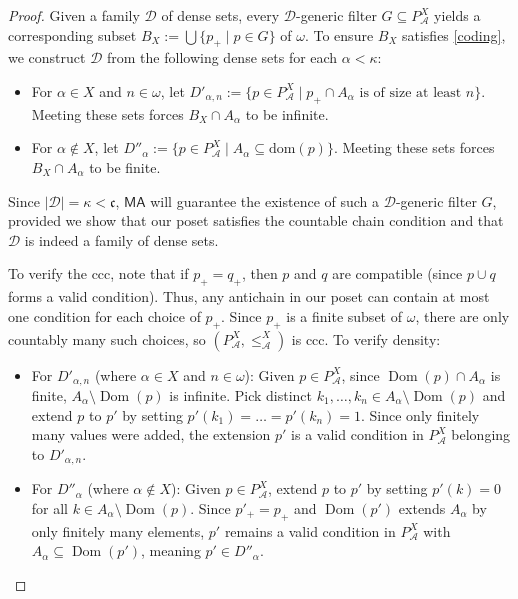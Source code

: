 \documentclass[12pt]{article}
\newcommand{\calA}{\mathcal{A}}
\newcommand{\calD}{\mathcal{D}}
\newcommand{\continuum}{\mathfrak{c}}
\newcommand{\dom}{\operatorname{Dom}}
\newcommand{\MA}{\mathsf{MA}}
\begin{document}
\begin{proof}
  Given a family $\calD$ of dense sets, every $\calD$-generic filter $G \subseteq P_\calA^X$ yields a corresponding subset $B_X := \bigcup \{ p_+ \mid p \in G \}$ of $\omega$.
  To ensure $B_X$ satisfies \eqref{coding}, we construct $\mathcal{D}$ from the following dense sets for each $\alpha < \kappa$:
  \begin{itemize}
    \item For $\alpha \in X$ and $n \in \omega$, let $D'_{\alpha, n} := \{ p \in P_\calA^X \mid p_+ \cap A_\alpha \text{ is of size at least } n \}$. Meeting these sets forces $B_X \cap A_\alpha$ to be infinite.
    \item For $\alpha \notin X$, let $D''_\alpha := \{ p \in P_\calA^X \mid A_\alpha \subseteq \mathrm{dom}(p) \}$. Meeting these sets forces $B_X \cap A_\alpha$ to be finite.
  \end{itemize}
  Since $|\calD| = \kappa < \continuum$, $\MA$ will guarantee the existence of such a $\calD$-generic filter $G$, provided we show that our poset satisfies the countable chain condition and that $\calD$ is indeed a family of dense sets.

  To verify the ccc, note that if $p_+ = q_+$, then $p$ and $q$ are compatible (since $p \cup q$ forms a valid condition).
  Thus, any antichain in our poset can contain at most one condition for each choice of $p_+$.
  Since $p_+$ is a finite subset of $\omega$, there are only countably many such choices, so $(P_\calA^X, \leq_\calA^X)$ is ccc.
  To verify density:
  \begin{itemize}
    \item For $D'_{\alpha, n}$ (where $\alpha \in X$ and $n \in \omega$):
          Given $p \in P_\calA^X$, since $\dom(p) \cap A_\alpha$ is finite, $A_\alpha \setminus \dom(p)$ is infinite.
          Pick distinct $k_1, \dots, k_n \in A_\alpha \setminus \dom(p)$ and extend $p$ to $p'$ by setting $p'(k_1) = \dots = p'(k_n) = 1$.
          Since only finitely many values were added, the extension $p'$ is a valid condition in $P_\calA^X$ belonging to $D'_{\alpha, n}$.
    \item For $D''_\alpha$ (where $\alpha \notin X$):
          Given $p \in P_\calA^X$, extend $p$ to $p'$ by setting $p'(k) = 0$ for all $k \in A_\alpha \setminus \dom(p)$.
          Since $p'_+ = p_+$ and $\dom(p')$ extends $A_\alpha$ by only finitely many elements, $p'$ remains a valid condition in $P_\calA^X$ with $A_\alpha \subseteq \dom(p')$, meaning $p' \in D''_\alpha$.
  \end{itemize}
  

\end{proof}
\end{document}
